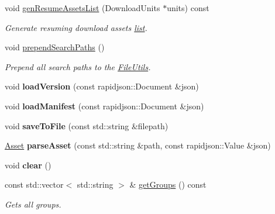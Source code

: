 \begin{DoxyCompactItemize}
void \hyperlink{classManifest_a864bd328575f36a37733ab13ba5e5df0}{gen\+Resume\+Assets\+List} (Download\+Units $\ast$units) const
\begin{DoxyCompactList}\small\item\em Generate resuming download assets \hyperlink{protocollist-p}{list}. \end{DoxyCompactList}\item 
\mbox{\label{classManifest_a44b5dff7463dac6a8106acbf8fb5871d}} 
void \hyperlink{classManifest_a44b5dff7463dac6a8106acbf8fb5871d}{prepend\+Search\+Paths} ()
\begin{DoxyCompactList}\small\item\em Prepend all search paths to the \hyperlink{classFileUtils}{File\+Utils}. \end{DoxyCompactList}\item 
\mbox{\label{classManifest_a92cb73198cdbcc2f128a6af28fad14b3}} 
void {\bfseries load\+Version} (const rapidjson\+::\+Document \&json)
\item 
\mbox{\label{classManifest_a10bd4096d9108f68caee8f09928ec822}} 
void {\bfseries load\+Manifest} (const rapidjson\+::\+Document \&json)
\item 
\mbox{\label{classManifest_aaf3349d213ada59351f327b597f186f4}} 
void {\bfseries save\+To\+File} (const std\+::string \&filepath)
\item 
\mbox{\label{classManifest_a76a68a23d3dd6b652dc271066e54f57b}} 
\hyperlink{structManifest_1_1Asset}{Asset} {\bfseries parse\+Asset} (const std\+::string \&path, const rapidjson\+::\+Value \&json)
\item 
\mbox{\label{classManifest_ac23c68d833be7957ed19e16bf874bfc4}} 
void {\bfseries clear} ()
\item 
\mbox{\label{classManifest_a4b8c7acde0d845fb4a6160391fe25333}} 
const std\+::vector$<$ std\+::string $>$ \& \hyperlink{classManifest_a4b8c7acde0d845fb4a6160391fe25333}{get\+Groups} () const
\begin{DoxyCompactList}\small\item\em Gets all groups. \end{DoxyCompactList}\item 

\end{DoxyCompactItemize}
